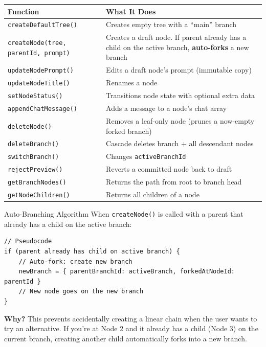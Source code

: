 \documentclass[12pt, a4paper]{article}
\begin{document}
\begin{table}[H]
\centering
\small
\begin{tabular}{@{}p{4.5cm}p{9cm}@{}}
\toprule
\textbf{Function} & \textbf{What It Does} \\
\midrule
\texttt{createDefaultTree()} & Creates empty tree with a ``main'' branch \\
\texttt{createNode(tree, parentId, prompt)} & Creates a draft node. If parent already has a child on the active branch, \textbf{auto-forks} a new branch \\
\texttt{updateNodePrompt()} & Edits a draft node's prompt (immutable copy) \\
\texttt{updateNodeTitle()} & Renames a node \\
\texttt{setNodeStatus()} & Transitions node state with optional extra data \\
\texttt{appendChatMessage()} & Adds a message to a node's chat array \\
\texttt{deleteNode()} & Removes a leaf-only node (prunes a now-empty forked branch) \\
\texttt{deleteBranch()} & Cascade deletes branch + all descendant nodes \\
\texttt{switchBranch()} & Changes \texttt{activeBranchId} \\
\texttt{rejectPreview()} & Reverts a committed node back to draft \\
\texttt{getBranchNodes()} & Returns the path from root to branch head \\
\texttt{getNodeChildren()} & Returns all children of a node \\
\bottomrule
\end{tabular}
\end{table}

\begin{conceptbox}{Auto-Branching Algorithm}
When \texttt{createNode()} is called with a parent that already has a child on the active branch:

\begin{lstlisting}
// Pseudocode
if (parent already has child on active branch) {
    // Auto-fork: create new branch
    newBranch = { parentBranchId: activeBranch, forkedAtNodeId: parentId }
    // New node goes on the new branch
}
\end{lstlisting}

\textbf{Why?} This prevents accidentally creating a linear chain when the user wants to try an alternative. If you're at Node 2 and it already has a child (Node 3) on the current branch, creating another child automatically forks into a new branch.
\end{conceptbox}
\end{document}
